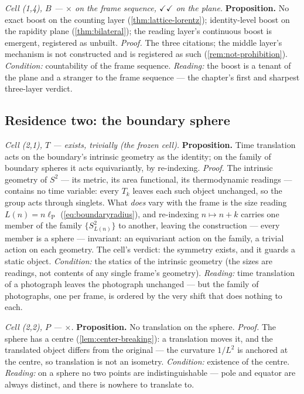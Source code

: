 \documentclass[11pt]{amsbook}
\theoremstyle{plain}
\theoremstyle{definition}
\theoremstyle{remark}
\begin{document}
\emph{Cell (1,4), $B$ --- $\times$ on the frame sequence, $\checkmark\checkmark$ on the plane.} \textbf{Proposition.} No exact boost on the counting layer (\cref{thm:lattice-lorentz}); identity-level boost on the rapidity plane (\cref{thm:bilateral}); the reading layer's continuous boost is emergent, registered as unbuilt. \emph{Proof.} The three citations; the middle layer's mechanism is not constructed and is registered as such (\cref{rem:not-prohibition}). \emph{Condition:} countability of the frame sequence. \emph{Reading:} the boost is a tenant of the plane and a stranger to the frame sequence --- the chapter's first and sharpest three-layer verdict.

\subsection{Residence two: the boundary sphere}\label{sec:grid-sphere}

\emph{Cell (2,1), $T$ --- exists, trivially (the frozen cell).} \textbf{Proposition.} Time translation acts on the boundary's intrinsic geometry as the identity; on the family of boundary spheres it acts equivariantly, by re-indexing. \emph{Proof.} The intrinsic geometry of $S^{2}$ --- its metric, its area functional, its thermodynamic readings --- contains no time variable: every $T_{k}$ leaves each such object unchanged, so the group acts through singlets. What \emph{does} vary with the frame is the size reading $L(n) = n\ell_{\mathrm P}$ (\cref{eq:boundaryradius}), and re-indexing $n \mapsto n+k$ carries one member of the family $\{S^{2}_{L(n)}\}$ to another, leaving the construction --- every member is a sphere --- invariant: an equivariant action on the family, a trivial action on each geometry. The cell's verdict: the symmetry exists, and it guards a static object. \emph{Condition:} the statics of the intrinsic geometry (the sizes are readings, not contents of any single frame's geometry). \emph{Reading:} time translation of a photograph leaves the photograph unchanged --- but the family of photographs, one per frame, is ordered by the very shift that does nothing to each.

\emph{Cell (2,2), $P$ --- $\times$.} \textbf{Proposition.} No translation on the sphere. \emph{Proof.} The sphere has a centre (\cref{lem:center-breaking}): a translation moves it, and the translated object differs from the original --- the curvature $1/L^{2}$ is anchored at the centre, so translation is not an isometry. \emph{Condition:} existence of the centre. \emph{Reading:} on a sphere no two points are indistinguishable --- pole and equator are always distinct, and there is nowhere to translate to.
\end{document}
